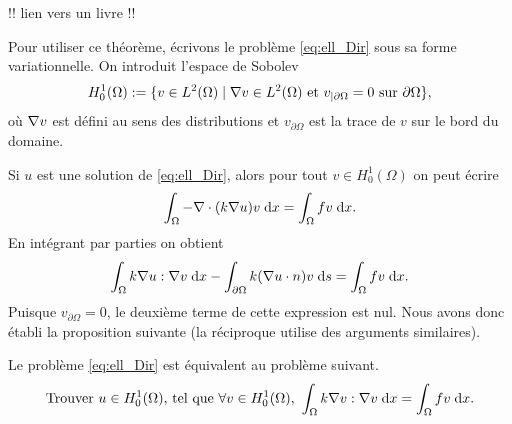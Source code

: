 \documentclass[12pt,a4paper,twoside]{article}
\begin{document}
!! lien vers un livre !!

Pour utiliser ce th\'eor\`eme, \'ecrivons le probl\`eme \eqref{eq:ell_Dir} sous
sa forme variationnelle.
On introduit l'espace de Sobolev
\begin{align}
  H_0^1(\Omega) := \{ v \in L^2(\Omega) \; | \; \nabla v \in L^2(\Omega) 
  \text{ et } v_{| \partial \Omega} = 0 \text{ sur } \partial \Omega \} ,
\end{align}
o\`u $\nabla v$ est d\'efini au sens des distributions et $v_{\partial \Omega}$
est la trace de $v$ sur le bord du domaine.


Si $u$ est une solution de \eqref{eq:ell_Dir}, alors pour tout $v \in H^1_0(\Omega)$
on peut \'ecrire
\begin{align*}
  \int_{\Omega} - \nabla \cdot (k \nabla u) v \;\mathrm{d} x = \int_{\Omega} f v \;\mathrm{d} x .
\end{align*}
En int\'egrant par parties on obtient 
\begin{align*}
  \int_{\Omega} k \nabla u : \nabla v \;\mathrm{d} x 
  - \int_{\partial \Omega} k (\nabla u \cdot n) v \;\mathrm{d} s = \int_{\Omega} f v \;\mathrm{d} x .
\end{align*}
Puisque $v_{\partial \Omega} = 0$, le deuxi\`eme terme de cette expression est nul.
Nous avons donc \'etabli la proposition suivante 
(la r\'eciproque utilise des arguments similaires).
\begin{proposition}
  Le probl\`eme \eqref{eq:ell_Dir} est \'equivalent au probl\`eme suivant.
  \begin{equation}
    \label{eq:LM2}
    \text{Trouver $u \in H_0^1(\Omega)$, tel que $\forall v \in H_0^1(\Omega)$, } 
    \int_{\Omega} k \nabla v : \nabla v \;\mathrm{d} x = \int_{\Omega} f v \;\mathrm{d} x .
  \end{equation}
\end{proposition}
\end{document}
